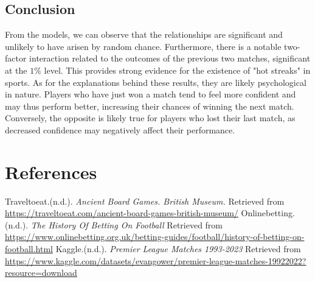 \documentclass{article}
\begin{document}
\subsection{Conclusion}
From the models, we can observe that the relationships are significant and unlikely to have arisen by random chance. Furthermore, there is a notable two-factor interaction related to the outcomes of the previous two matches, significant at the $1\%$ level. This provides strong evidence for the existence of "hot streaks" in sports.\newline
\newline
As for the explanations behind these results, they are likely psychological in nature. Players who have just won a match tend to feel more confident and may thus perform better, increasing their chances of winning the next match. Conversely, the opposite is likely true for players who lost their last match, as decreased confidence may negatively affect their performance.
\newpage
\section{References}


\begin{thebibliography}{11}

Traveltoeat.(n.d.). \textit{Ancient Board Games. British Museum.} Retrieved from
\newline
\href{https://traveltoeat.com/ancient-board-games-british-museum/}{https://traveltoeat.com/ancient-board-games-british-museum/}
Onlinebetting.(n.d.). \textit{The History Of Betting On Football} Retrieved from
\newline
\href{https://www.onlinebetting.org.uk/betting-guides/football/history-of-betting-on-football.html}{https://www.onlinebetting.org.uk/betting-guides/football/history-of-betting-on-football.html}
Kaggle.(n.d.). \textit{Premier League Matches 1993-2023} Retrieved from
\newline
\href{https://www.kaggle.com/datasets/evangower/premier-league-matches-19922022?resource=download}{https://www.kaggle.com/datasets/evangower/premier-league-matches-19922022?resource=download}
\end{thebibliography}
\end{document}
